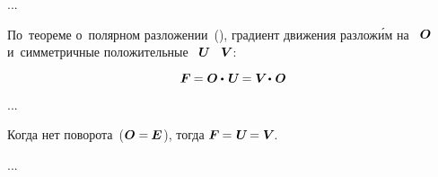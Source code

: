 ...

\begin{otherlanguage}{russian}

По~теореме о~полярном разложении~(), градиент движения разлож\'{и}м на ~$\bm{O}$ и~симметричные положительные ~${\bm{U}\hspace{-0.25ex}}$ ~${\bm{V}\hspace{-0.1ex}}$:

\nopagebreak\vspace{-0.1em}\begin{equation*}
 \bm{F} \hspace{-0.1ex} = \rotationtensor \dotp \hspace{.25ex} \bm{U} \hspace{-0.2ex} = \bm{V} \hspace{-0.3ex} \dotp \hspace{.15ex} \rotationtensor
\end{equation*}

...

Когда нет поворота~(${\bm{O} = \hspace{-0.1ex} \bm{E} \hspace{0.1ex}}$), тогда ${\bm{F} \hspace{-0.1ex} = \hspace{0.1ex} \bm{U} \hspace{-0.25ex} = \bm{V}\hspace{-0.3ex}}$.

...



\end{otherlanguage}



\label{para:deformationtensors}

